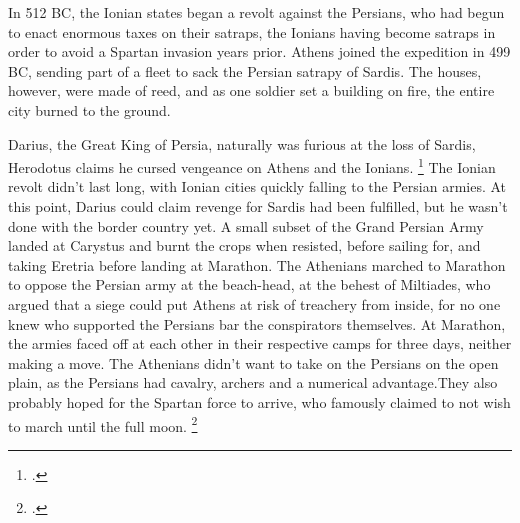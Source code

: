\documentclass[twoside, a4paper, 12pt]{article}
\begin{document}
\par\vspace{1em}

In 512 BC, the Ionian states began a revolt against the Persians, who had
begun to enact enormous taxes on their satraps, the Ionians having become
satraps in order to avoid a Spartan invasion years prior.\footnotemark
Athens joined the expedition in 499 BC, sending part of a fleet to sack the Persian
satrapy of Sardis. The houses, however, were made of reed, and as one soldier
set a building on fire, the entire city burned to the ground.\footnotemark[\value{footnote}]

\par\vspace{1em}

Darius, the Great King of Persia, naturally was furious at the loss of Sardis,
Herodotus claims he cursed vengeance on Athens and the Ionians.
\footcite[Book 5.105]{herodotus_1920}
The Ionian revolt didn't last long, with Ionian cities quickly falling to the
Persian armies. At this point, Darius could claim revenge for Sardis had been
fulfilled, but he wasn't done with the border country yet. A small subset of the
Grand Persian Army landed at Carystus and burnt the crops when resisted,
before sailing for, and taking Eretria before landing at Marathon.
\footnotemark
The Athenians marched to Marathon to oppose the Persian army at the beach-head,
at the behest of Miltiades, who argued that a siege could put Athens at risk of
treachery from inside, for no one knew who supported the Persians bar the
conspirators themselves. At Marathon, the armies faced off at each other in their
respective camps for three days, neither making a move. The Athenians didn't
want to take on the Persians on the open plain, as the Persians had cavalry,
archers and a numerical advantage.\footnotemark[\value{footnote}]
They also probably hoped for the Spartan force to arrive, who famously claimed
to not wish to march until the full moon.
\footcite[Book 6.106]{herodotus_1920}

\par\vspace{1em}
\end{document}
